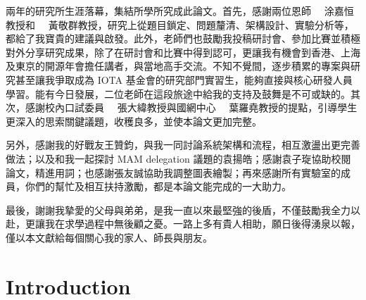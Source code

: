 \begin{spacing}{2.0}

兩年的研究所生涯落幕，集結所學所究成此論文。首先，感謝兩位恩師 \ \ 涂嘉恒教授和 \ \ 黃敬群教授，研究上從題目鎖定、問題釐清、架構設計、實驗分析等，都給了我寶貴的建議與啟發。此外，老師們也鼓勵我投稿研討會、參加比賽並積極對外分享研究成果，除了在研討會和比賽中得到認可，更讓我有機會到香港、上海及東京的開源年會擔任講者，與當地高手交流。不知不覺間，逐步積累的專案與研究甚至讓我爭取成為 IOTA 基金會的研究部門實習生，能夠直接與核心研發人員學習。能有今日發展，二位老師在這段旅途中給我的支持及鼓舞是不可或缺的。其次，感謝校內口試委員 \ \ 張大緯教授與國網中心 \ \ 葉羅堯教授的提點，引導學生更深入的思索關鍵議題，收穫良多，並使本論文更加完整。

另外，感謝我的好戰友王贊鈞，與我一同討論系統架構和流程，相互激盪出更完善做法；以及和我一起探討 MAM delegation 議題的袁揚皓；感謝袁子琁協助校閱論文，精進用詞；也感謝張友誠協助我調整圖表繪製；再來感謝所有實驗室的成員，你們的幫忙及相互扶持激勵，都是本論文能完成的一大助力。

最後，謝謝我摯愛的父母與弟弟，是我一直以來最堅強的後盾，不僅鼓勵我全力以赴，更讓我在求學過程中無後顧之憂。一路上多有貴人相助，願日後得湧泉以報，僅以本文獻給每個關心我的家人、師長與朋友。

\end{spacing}

\clearpage
{}



\renewcommand*\contentsname{Table of Contents}
\singlespacing
\newpage
{}
\pagestyle{plain}
\tableofcontents
\clearpage
{}

\listoftables
\listoffigures

\setcounter{page}{1}
\newpage
{}
\chapter{Introduction}
\pagestyle{plain}

